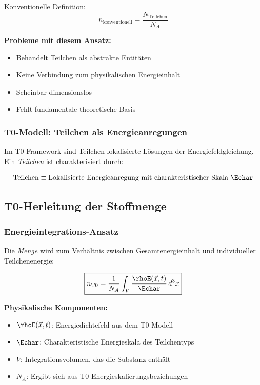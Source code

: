 	Konventionelle Definition:
	\begin{equation}
		n_{\text{konventionell}} = \frac{N_{\text{Teilchen}}}{N_A}
		\label{eq:konventionelles_mol}
	\end{equation}
	
	\textbf{Probleme mit diesem Ansatz:}
	\begin{itemize}
		\item Behandelt Teilchen als abstrakte Entitäten
		\item Keine Verbindung zum physikalischen Energieinhalt
		\item Scheinbar dimensionslos
		\item Fehlt fundamentale theoretische Basis
	\end{itemize}
	
	\subsubsection{T0-Modell: Teilchen als Energieanregungen}
	\label{subsubsec:t0_teilchen_energie}
	
	Im T0-Framework sind Teilchen lokalisierte Lösungen der Energiefeldgleichung. Ein \textit{Teilchen} ist charakterisiert durch:
	
	\begin{equation}
		\text{Teilchen} \equiv \text{Lokalisierte Energieanregung mit charakteristischer Skala } \Echar
		\label{eq:t0_teilchen_definition}
	\end{equation}
	
	\subsection{T0-Herleitung der Stoffmenge}
	\label{subsec:t0_mol_herleitung}
	
	\subsubsection{Energieintegrations-Ansatz}
	\label{subsubsec:energieintegration}
	
	Die \textit{Menge} wird zum Verhältnis zwischen Gesamtenergieinhalt und individueller Teilchenenergie:
	
	\begin{equation}
		\boxed{n_{\text{T0}} = \frac{1}{N_A} \int_V \frac{\rhoE(\vec{x},t)}{\Echar} \, d^3x}
		\label{eq:t0_mol_fundamental}
	\end{equation}
	
	\textbf{Physikalische Komponenten:}
	\begin{itemize}
		\item $\rhoE(\vec{x},t)$: Energiedichtefeld aus dem T0-Modell
		\item $\Echar$: Charakteristische Energieskala des Teilchentyps
		\item $V$: Integrationsvolumen, das die Substanz enthält
		\item $N_A$: Ergibt sich aus T0-Energieskalierungsbeziehungen
	\end{itemize}
	
